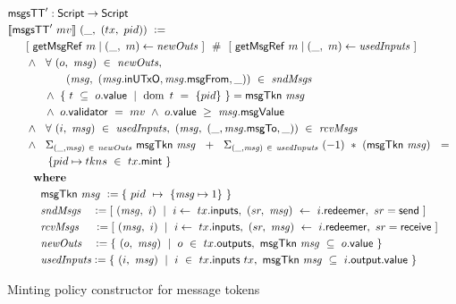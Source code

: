 %
\begin{figure}
  \begin{align*}
    & \mathsf{msgsTT}' : \textsf{Script} \to \textsf{Script} \\
    &\llbracket\mathsf{msgsTT}'~mv\rrbracket~(\_,~(tx,~pid))~\mathrel{\mathop:}= \\
    &~~~~~[~\mathsf{getMsgRef}~ m \mid (\_,\ m) \leftarrow \mathit{newOuts}~]~~\#~~
          [~\mathsf{getMsgRef}~ m \mid (\_,\ m) \leftarrow \mathit{usedInputs}~] \\
    &~~~~~\wedge~~\forall~(o,~\mathit{msg})~\in~\mathit{newOuts},~ \\
    &~~~~~~~~~~~~~~~~(\mathit{msg},~(\mathit{msg}.\mathsf{inUTxO}, \mathit{msg}.\mathsf{msgFrom}, \_))~\in~\mathit{sndMsgs} \\
    &~~~~~~~~~~\wedge~\{~t~ \subseteq~o.\mathsf{value}~\mid~\operatorname{dom}~t~=~\{pid\}~\} = \mathsf{msgTkn}~\mathit{msg} \\
    &~~~~~~~~~~\wedge~o.\mathsf{validator}~=~mv~\wedge~o.\mathsf{value}~\geq~\mathit{msg}.\mathsf{msgValue} \\
    &~~~~~\wedge~~\forall~(i,~\mathit{msg})~\in~\mathit{usedInputs},\
    (\mathit{msg},~(\_, \mathit{msg}.\mathsf{msgTo}, \_))~\in~\mathit{rcvMsgs}\\
    &~~~~~\wedge~~\Sigma_{(\_,\mathit{msg})~\in~\mathit{newOuts}}~\mathsf{msgTkn}~\mathit{msg} ~~+~~
    \Sigma_{(\_, \mathit{msg})~\in~\mathit{usedInputs}}~(-1) ~*~ (\mathsf{msgTkn}~\mathit{msg}) ~~=~~\\
    &~~~~~~~~~~~\{pid \mapsto tkns~\in~tx.\mathsf{mint}~\} \\
    &~~~~~~ ~ \mathbf{where}~ ~  \\
    &~~~~~~~~~\mathsf{msgTkn}~\mathit{msg}~\mathrel{\mathop:}= \{~pid ~\mapsto~ \{\mathit{msg} \mapsto 1\}~\} \\
    &~~~~~~~~~\mathit{sndMsgs}~~~\mathrel{\mathop:}= [~ (\mathit{msg},~i)~\mid~i\leftarrow~tx.\mathsf{inputs},
    ~(sr,~\mathit{msg})~ \leftarrow~ i.\mathsf{redeemer},~sr=\mathsf{send}~] \\
    &~~~~~~~~~\mathit{rcvMsgs}~~~~\mathrel{\mathop:}= [~ (\mathit{msg},~i)~\mid~i\leftarrow~tx.\mathsf{inputs},
    ~(sr,~\mathit{msg})~\leftarrow~i.\mathsf{redeemer},~sr=\mathsf{receive}~] \\
    &~~~~~~~~~\mathit{newOuts}~~~\mathrel{\mathop:}= \{~(o,~\mathit{msg})~\mid~o~\in~tx.\mathsf{outputs},~
    \mathsf{msgTkn}~\mathit{msg}~\subseteq~o.\mathsf{value}~\} \\
    &~~~~~~~~~\mathit{usedInputs} \mathrel{\mathop:}= \{~ (i,~\mathit{msg})~\mid~
    i~ \in~ tx.\mathsf{inputs}~tx,~\mathsf{msgTkn}~\mathit{msg}~\subseteq~i.\mathsf{output}.\mathsf{value} ~\} \\
  \end{align*}
\caption{Minting policy constructor for message tokens}
\label{fig:msgs-codeTT}
\end{figure}

